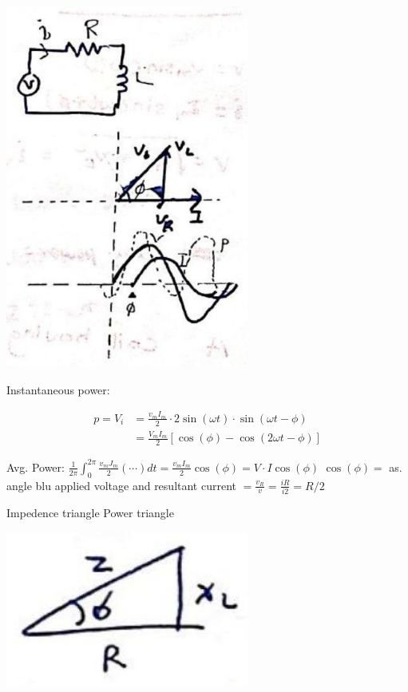 \documentclass[12pt, a4paper]{article}
\newcommand{\figwidth}{8cm}
\begin{document}
	\begin{center}
		\includegraphics[max width=\figwidth]{2024_06_15_74bbabba7981675b0d49g-06(1)}
	\end{center}

	Instantaneous power:

	$$
		\begin{aligned}
			p=V_{i} & =\frac{v_{m} I_{m}}{2} \cdot 2 \sin (\omega t) \cdot \sin (\omega t-\phi) \\
			        & =\frac{V_{m} I_{m}}{2}[\cos (\phi)-\cos (2 \omega t-\phi)]
		\end{aligned}
	$$

	Avg. Power: $\frac{1}{2 \pi} \int_{0}^{2 \pi} \frac{v_{m} J_{m}}{2}(\cdots) d t=\frac{v_{m} I_{m}}{2} \cos (\phi)=V \cdot I \cos (\phi)$ $\cos (\phi)=$ as. angle blu applied voltage and resultant current $=\frac{v_{R}}{v}=\frac{i R}{i 2}=R / 2$

	Impedence triangle Power triangle

	\begin{center}
		\includegraphics[max width=\figwidth]{2024_06_15_74bbabba7981675b0d49g-07}
	\end{center}
\end{document}
